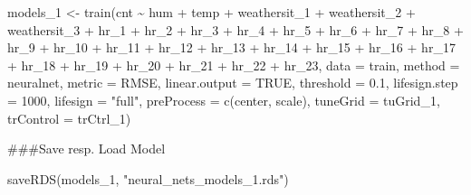\documentclass[
]{article}
\newenvironment{Shaded}{\begin{snugshade}}{\end{snugshade}}
\newcommand{\AttributeTok}[1]{\textcolor[rgb]{0.77,0.63,0.00}{#1}}
\newcommand{\ConstantTok}[1]{\textcolor[rgb]{0.00,0.00,0.00}{#1}}
\newcommand{\DecValTok}[1]{\textcolor[rgb]{0.00,0.00,0.81}{#1}}
\newcommand{\FloatTok}[1]{\textcolor[rgb]{0.00,0.00,0.81}{#1}}
\newcommand{\FunctionTok}[1]{\textcolor[rgb]{0.00,0.00,0.00}{#1}}
\newcommand{\NormalTok}[1]{#1}
\newcommand{\OtherTok}[1]{\textcolor[rgb]{0.56,0.35,0.01}{#1}}
\newcommand{\SpecialCharTok}[1]{\textcolor[rgb]{0.00,0.00,0.00}{#1}}
\newcommand{\StringTok}[1]{\textcolor[rgb]{0.31,0.60,0.02}{#1}}
\begin{document}
\begin{Shaded}
\begin{Highlighting}[]
\NormalTok{models\_1 }\OtherTok{\textless{}{-}} \FunctionTok{train}\NormalTok{(cnt }\SpecialCharTok{\textasciitilde{}}\NormalTok{ hum }\SpecialCharTok{+}\NormalTok{ temp }\SpecialCharTok{+}\NormalTok{ weathersit\_1 }\SpecialCharTok{+}\NormalTok{ weathersit\_2 }\SpecialCharTok{+}\NormalTok{ weathersit\_3 }\SpecialCharTok{+}\NormalTok{ hr\_1 }\SpecialCharTok{+}\NormalTok{ hr\_2 }\SpecialCharTok{+}\NormalTok{ hr\_3 }\SpecialCharTok{+}\NormalTok{ hr\_4 }\SpecialCharTok{+}\NormalTok{ hr\_5 }\SpecialCharTok{+}\NormalTok{ hr\_6 }\SpecialCharTok{+}\NormalTok{ hr\_7 }\SpecialCharTok{+}\NormalTok{ hr\_8 }\SpecialCharTok{+}\NormalTok{ hr\_9 }\SpecialCharTok{+}\NormalTok{ hr\_10 }\SpecialCharTok{+}\NormalTok{ hr\_11 }\SpecialCharTok{+}\NormalTok{ hr\_12 }\SpecialCharTok{+}\NormalTok{ hr\_13 }\SpecialCharTok{+}\NormalTok{ hr\_14 }\SpecialCharTok{+}\NormalTok{ hr\_15 }\SpecialCharTok{+}\NormalTok{ hr\_16 }\SpecialCharTok{+}\NormalTok{ hr\_17 }\SpecialCharTok{+}\NormalTok{ hr\_18 }\SpecialCharTok{+}\NormalTok{ hr\_19 }\SpecialCharTok{+}\NormalTok{ hr\_20 }\SpecialCharTok{+}\NormalTok{ hr\_21 }\SpecialCharTok{+}\NormalTok{ hr\_22 }\SpecialCharTok{+}\NormalTok{ hr\_23, }\AttributeTok{data =}\NormalTok{ train,}
                  \AttributeTok{method =} \StringTok{\textquotesingle{}neuralnet\textquotesingle{}}\NormalTok{,}
                  \AttributeTok{metric =} \StringTok{\textquotesingle{}RMSE\textquotesingle{}}\NormalTok{,}
                  \AttributeTok{linear.output =} \ConstantTok{TRUE}\NormalTok{,}
                  \AttributeTok{threshold =} \FloatTok{0.1}\NormalTok{,}
                  \AttributeTok{lifesign.step =} \DecValTok{1000}\NormalTok{,}
                  \AttributeTok{lifesign =} \StringTok{"full"}\NormalTok{,}
                  \AttributeTok{preProcess =} \FunctionTok{c}\NormalTok{(}\StringTok{\textquotesingle{}center\textquotesingle{}}\NormalTok{, }\StringTok{\textquotesingle{}scale\textquotesingle{}}\NormalTok{),}
                  \AttributeTok{tuneGrid =}\NormalTok{ tuGrid\_1,}
                  \AttributeTok{trControl =}\NormalTok{ trCtrl\_1)}
\end{Highlighting}
\end{Shaded}

\#\#\#Save resp. Load Model

\begin{Shaded}
\begin{Highlighting}[]
\FunctionTok{saveRDS}\NormalTok{(models\_1, }\StringTok{"neural\_nets\_models\_1.rds"}\NormalTok{)}
\end{Highlighting}
\end{Shaded}
\end{document}
